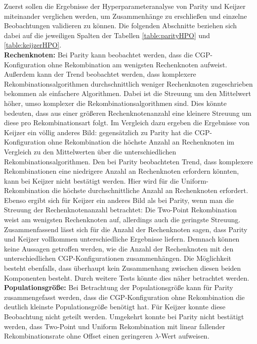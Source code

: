 Zuerst sollen die Ergebnisse der Hyperparameteranalyse von Parity und Keijzer miteinander verglichen werden, um Zusammenhänge zu erschließen und einzelne Beobachtungen validieren zu können.
Die folgenden Abschnitte beziehen sich dabei auf die jeweiligen Spalten der Tabellen \ref{table:parityHPO} und \ref{table:keijzerHPO}.\\
\textbf{Rechenknoten:} Bei Parity kann beobachtet werden, dass die CGP-Konfiguration ohne Rekombination am wenigsten Rechenknoten aufweist. 
Außerdem kann der Trend beobachtet werden, dass komplexere Rekombinationsalgorithmen durchschnittlich weniger Rechenknoten zugeschrieben bekommen als einfachere Algorithmen.
Dabei ist die Streuung um den Mittelwert höher, umso komplexer die Rekombinationsalgorithmen sind.
Dies könnte bedeuten, dass aus einer größeren Rechenknotenanzahl eine kleinere Streuung um diese pro Rekombinationsart folgt.
Im Vergleich dazu ergeben die Ergebnisse von Keijzer ein völlig anderes Bild: gegensätzlich zu Parity hat die CGP-Konfiguration ohne Rekombination die höchste Anzahl an Rechenknoten im Vergleich zu den Mittelwerten über die unterschiedlichen Rekombinationsalgorithmen.
Den bei Parity beobachteten Trend, dass komplexere Rekombinationen eine niedrigere Anzahl an Rechenknoten erfordern könnten, kann bei Keijzer nicht bestätigt werden.
Hier wird für die Uniform-Rekombination die höchste durchschnittliche Anzahl an Rechenknoten erfordert.
Ebenso ergibt sich für Keijzer ein anderes Bild als bei Parity, wenn man die Streuung der Rechenknotenanzahl betrachtet: Die Two-Point Rekombination weist am wenigsten Rechenknoten auf, allerdings auch die geringste Streuung.
Zusammenfassend lässt sich für die Anzahl der Rechenknoten sagen, dass Parity und Keijzer vollkommen unterschiedliche Ergebnisse liefern.
Demnach können keine Aussagen getroffen werden, wie die Anzahl der Rechenknoten mit den unterschiedlichen CGP-Konfigurationen zusammenhängen.
Die Möglichkeit besteht ebenfalls, dass überhaupt kein Zusammenhang zwischen diesen beiden Komponenten besteht.
Durch weitere Tests könnte dies näher betrachtet werden.\\
\textbf{Populationsgröße:} Bei Betrachtung der Populationsgröße kann für Parity zusammengefasst werden, dass die CGP-Konfiguration ohne Rekombination die deutlich kleinste Populationsgröße benötigt hat.
Für Keijzer konnte diese Beobachtung nicht geteilt werden.
Umgekehrt konnte bei Parity nicht bestätigt werden, dass Two-Point und Uniform Rekombination mit linear fallender Rekombinationsrate ohne Offset einen geringeren $\lambda$-Wert aufweisen.
